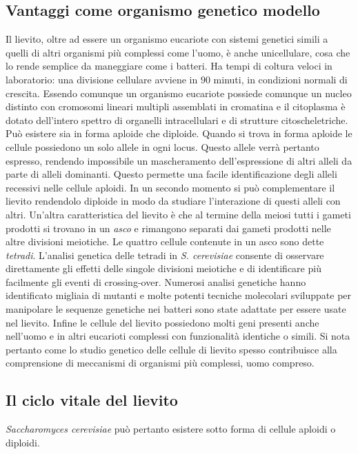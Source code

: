 	\subsection*{Vantaggi come organismo genetico modello}
	Il lievito, oltre ad essere un organismo eucariote con sistemi genetici simili a quelli di altri organismi pi\`u complessi come l'uomo, \`e anche unicellulare, cosa che lo rende semplice da maneggiare come i batteri.
	Ha tempi di coltura veloci in laboratorio: una divisione cellulare avviene in $90$ minuti, in condizioni normali di crescita.
	Essendo comunque un organismo eucariote possiede comunque un nucleo distinto con cromosomi lineari multipli assemblati in cromatina e il citoplasma \`e dotato dell'intero spettro di organelli intracellulari e di strutture citoscheletriche.
	Pu\`o esistere sia in forma aploide che diploide.
	Quando si trova in forma aploide le cellule possiedono un solo allele in ogni locus.
	Questo allele verr\`a pertanto espresso, rendendo impossibile un mascheramento dell'espressione di altri alleli da parte di alleli dominanti.
	Questo permette una facile identificazione degli alleli recessivi nelle cellule aploidi.
	In un secondo momento si pu\`o complementare il lievito rendendolo diploide in modo da studiare l'interazione di questi alleli con altri.
	Un'altra caratteristica del lievito \`e che al termine della meiosi tutti i gameti prodotti si trovano in un \emph{asco} e rimangono separati dai gameti prodotti nelle altre divisioni meiotiche.
	Le quattro cellule contenute in un asco sono dette \emph{tetradi}.
	L'analisi genetica delle tetradi in \emph{S. cerevisiae} consente di osservare direttamente gli effetti delle singole divisioni meiotiche e di identificare pi\`u facilmente gli eventi di crossing-over.
	Numerosi analisi genetiche hanno identificato migliaia di mutanti e molte potenti tecniche molecolari sviluppate per manipolare le sequenze genetiche nei batteri sono state adattate per essere usate nel lievito.
	Infine le cellule del lievito possiedono molti geni presenti anche nell'uomo e in altri eucarioti complessi con funzionalit\`a identiche o simili.
	Si nota pertanto come lo studio genetico delle cellule di lievito spesso contribuisce alla comprensione di meccanismi di organismi pi\`u complessi, uomo compreso.

	\subsection*{Il ciclo vitale del lievito}
	\emph{Saccharomyces cerevisiae} pu\`o pertanto esistere sotto forma di cellule aploidi o diploidi.

